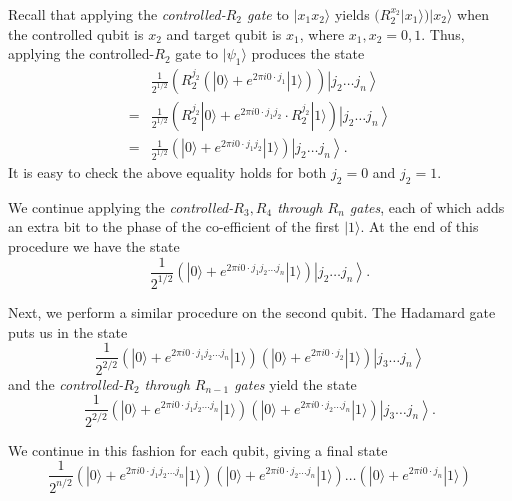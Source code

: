 Recall that applying the \textit{controlled-$R_{2}$ gate} to $|x_1 x_2 \rangle$ yields $(R_{2}^{x_2}|x_1\rangle) |x_2 \rangle$ when the controlled qubit is $x_2$ and target qubit is $x_1$, where $x_1,x_2=0,1.$ Thus, applying the controlled-$R_{2}$ gate to $|\psi_1\rangle$ produces the state
\begin{align*}
&\frac{1}{2^{1 / 2}} \left( R_{2}^{j_2} \left(|0\rangle+e^{2 \pi i 0 \cdot j_{1}}|1\rangle\right) \right) \left|j_{2} \ldots j_{n}\right\rangle \\
=&\frac{1}{2^{1 / 2}}\left(R_{2}^{j_2} |0\rangle+e^{2 \pi i 0 \cdot j_{1} j_{2}}\cdot R_{2}^{j_2} |1\rangle\right)\left|j_{2} \ldots j_{n}\right\rangle \\
=&\frac{1}{2^{1 / 2}}\left(|0\rangle+e^{2 \pi i 0 \cdot j_{1} j_{2}}|1\rangle\right)\left|j_{2} \ldots j_{n}\right\rangle.     \tag{5.13}
\end{align*}
It is easy to check the above equality holds for both $j_2=0$ and $j_2=1.$ 

We continue applying the \textit{controlled-$R_{3}, R_{4}$ through $R_{n}$ gates}, each of which adds an extra bit to the phase of the co-efficient of the first $|1\rangle$. At the end of this procedure we have the state
\begin{equation*}
\frac{1}{2^{1 / 2}}\left(|0\rangle+e^{2 \pi i 0 \cdot j_{1} j_{2} \ldots j_{n}}|1\rangle\right)\left|j_{2} \ldots j_{n}\right\rangle. \tag{5.14}
\end{equation*}

Next, we perform a similar procedure on the second qubit. The Hadamard gate puts us in the state
\begin{equation*}
\frac{1}{2^{2 / 2}}\left(|0\rangle+e^{2 \pi i 0 \cdot j_{1} j_{2} \ldots j_{n}}|1\rangle\right)\left(|0\rangle+e^{2 \pi i 0 \cdot j_{2}}|1\rangle\right)\left|j_{3} \ldots j_{n}\right\rangle \tag{5.15}
\end{equation*}
and the \textit{controlled-$R_{2}$ through $R_{n-1}$ gates} yield the state
\begin{equation*}
\frac{1}{2^{2 / 2}}\left(|0\rangle+e^{2 \pi i 0 \cdot j_{1} j_{2} \ldots j_{n}}|1\rangle\right)\left(|0\rangle+e^{2 \pi i 0 \cdot j_{2} \ldots j_{n}}|1\rangle\right)\left|j_{3} \ldots j_{n}\right\rangle. \tag{5.16}
\end{equation*}

We continue in this fashion for each qubit, giving a final state
\begin{equation*}
\frac{1}{2^{n / 2}}\left(|0\rangle+e^{2 \pi i 0 \cdot j_{1} j_{2} \ldots j_{n}}|1\rangle\right)\left(|0\rangle+e^{2 \pi i 0 \cdot j_{2} \ldots j_{n}}|1\rangle\right) \ldots\left(|0\rangle+e^{2 \pi i 0 \cdot j_{n}}|1\rangle\right) \tag{5.17}
\end{equation*}

